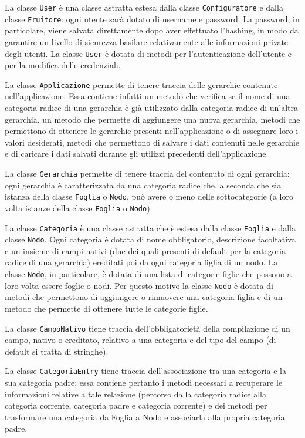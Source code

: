 La classe \texttt{User} è una classe astratta estesa dalla classe \texttt{Configuratore} e dalla classe \texttt{Fruitore}: ogni utente sarà dotato di username e password. La password, in particolare, viene salvata direttamente dopo aver effettuato l'hashing, in modo da garantire un livello di sicurezza basilare relativamente alle informazioni private degli utenti. La classe \texttt{User} è dotata di metodi per l'autenticazione dell'utente e per la modifica delle credenziali.

La classe \texttt{Applicazione} permette di tenere traccia delle gerarchie contenute nell'applicazione. 
Essa contiene infatti un metodo che verifica se il nome di una categoria radice di una gerarchia è già utilizzato dalla categoria radice di un'altra gerarchia, un metodo che permette di aggiungere una nuova gerarchia, metodi che permettono di ottenere le gerarchie presenti nell'applicazione o di assegnare loro i valori desiderati, metodi che permettono di salvare i dati contenuti nelle gerarchie e di caricare i dati salvati durante gli utilizzi precedenti dell'applicazione.

La classe \texttt{Gerarchia} permette di tenere traccia del contenuto di ogni gerarchia: ogni gerarchia è caratterizzata da una categoria radice che, a seconda che sia istanza della classe \texttt{Foglia} o \texttt{Nodo}, può avere o meno delle sottocategorie (a loro volta istanze della classe \texttt{Foglia} o \texttt{Nodo}). 

La classe \texttt{Categoria} è una classe astratta che è estesa dalla classe \texttt{Foglia} e dalla classe \texttt{Nodo}. Ogni categoria è dotata di nome obbligatorio, descrizione facoltativa e un insieme di campi nativi (due dei quali presenti di default per la categoria radice di una gerarchia) ereditati poi da ogni categoria figlia di un nodo.
La classe \texttt{Nodo}, in particolare, è dotata di una lista di categorie figlie che possono a loro volta essere foglie o nodi. Per questo motivo la classe \texttt{Nodo} è dotata di metodi che permettono di aggiungere o rimuovere una categoria figlia e di un metodo che permette di ottenere tutte le categorie figlie.

La classe \texttt{CampoNativo} tiene traccia dell'obbligatorietà della compilazione di un campo, nativo o ereditato, relativo a una categoria e del tipo del campo (di default si tratta di stringhe). 

La classe \texttt{CategoriaEntry} tiene traccia dell'associazione tra una categoria e la sua categoria padre; essa contiene pertanto i metodi necessari a recuperare le informazioni relative a tale relazione (percorso dalla categoria radice alla categoria corrente, categoria padre e categoria corrente) e dei metodi per trasformare una categoria da Foglia a Nodo e associarla alla propria categoria padre.

